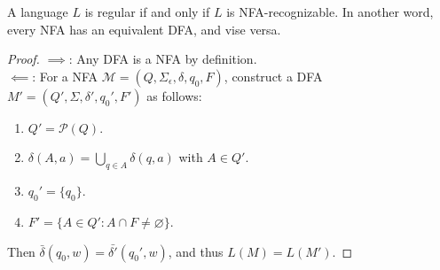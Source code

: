 \begin{theorem}
    A language $L$ is regular if and only if $L$ is NFA-recognizable. In another word, every NFA has an equivalent DFA, and vise versa.
\end{theorem}
\begin{proof}
$\implies$: Any DFA is a NFA by definition.
\\ $\impliedby$: For a NFA $\mathcal{M} = (Q, \Sigma_\epsilon, \delta, q_0, F)$, construct a DFA $M' = (Q', \Sigma, \delta', q_0', F')$ as follows:
\begin{enumerate}
    \item $Q' = \mathcal{P}(Q)$.
    \item $\delta(A, a) = \bigcup_{q \in A} \delta(q,a)$ with $A \in Q'$.
    \item $q_0' = \{ q_0 \}$.
    \item $F' = \{ A \in Q' : A \cap F \neq \varnothing \}$.
\end{enumerate}
Then $\bar{\delta}(q_0,w) = \bar{\delta'}(q_0', w)$, and thus $L(M) = L(M')$.
\end{proof}

